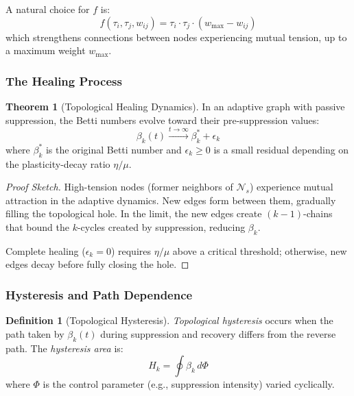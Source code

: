 \documentclass[12pt,a4paper]{article}
\theoremstyle{definition}
\newtheorem{definition}{Definition}[section]
\newtheorem{theorem}{Theorem}[section]
\theoremstyle{remark}
\newcommand{\NS}{\mathcal{N}_s}          %
\begin{document}
A natural choice for $f$ is:
\begin{equation}
    f(\tau_i, \tau_j, w_{ij}) = \tau_i \cdot \tau_j \cdot (w_{\max} - w_{ij})
\end{equation}
which strengthens connections between nodes experiencing mutual tension, up to a maximum weight $w_{\max}$.

\subsubsection{The Healing Process}

\begin{theorem}[Topological Healing Dynamics]
\label{thm:healing}
In an adaptive graph with passive suppression, the Betti numbers evolve toward their pre-suppression values:
\begin{equation}
    \beta_k(t) \xrightarrow{t \to \infty} \beta_k^* + \epsilon_k
\end{equation}
where $\beta_k^*$ is the original Betti number and $\epsilon_k \geq 0$ is a small residual depending on the plasticity-decay ratio $\eta/\mu$.
\end{theorem}

\begin{proof}[Proof Sketch]
High-tension nodes (former neighbors of $\NS$) experience mutual attraction in the adaptive dynamics. New edges form between them, gradually filling the topological hole. In the limit, the new edges create $(k-1)$-chains that bound the $k$-cycles created by suppression, reducing $\beta_k$.

Complete healing ($\epsilon_k = 0$) requires $\eta/\mu$ above a critical threshold; otherwise, new edges decay before fully closing the hole.
\end{proof}

\subsubsection{Hysteresis and Path Dependence}

\begin{definition}[Topological Hysteresis]
\emph{Topological hysteresis} occurs when the path taken by $\beta_k(t)$ during suppression and recovery differs from the reverse path. The \emph{hysteresis area} is:
\begin{equation}
    H_k = \oint \beta_k \, d\Phi
\end{equation}
where $\Phi$ is the control parameter (e.g., suppression intensity) varied cyclically.
\end{definition}
\end{document}
